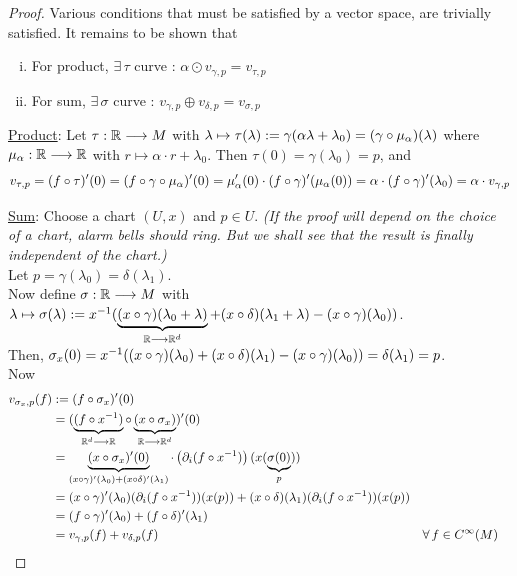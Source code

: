 \begin{proof} Various conditions that must be satisfied by a vector space, are trivially satisfied. It remains to be shown that 
\begin{enumerate}[i)]
  \item For product, $\exists \, \tau $ curve : $\alpha \odot v_{\gamma,p} = v_{\tau,p}$
  \item For sum, $\exists \, \sigma$ curve : $v_{\gamma,p} \oplus v_{\delta,p} = v_{\sigma,p}$
\end{enumerate}
\underline{Product}: Let $\tau : \mathbb{R} \longrightarrow M$ with $\lambda \mapsto \tau(\lambda) := \gamma(\alpha  \lambda + \lambda_0) = (\gamma \circ \mu_{\alpha})(\lambda)$
where $\mu_{\alpha} : \mathbb{R} \longrightarrow \mathbb{R}$ with $r \mapsto \alpha \cdot r + \lambda_0$. Then $\tau(0) = \gamma(\lambda_0) = p$, and
\[
v_{\tau,p} = (f \circ \tau)^{\prime}(0) = (f \circ \gamma \circ \mu_{\alpha})^{\prime}(0) = \mu_{\alpha}^{\prime}(0) \cdot (f \circ \gamma)^{\prime}(\mu_{\alpha}(0)) = \alpha \cdot (f \circ \gamma)^{\prime}(\lambda_0) = \alpha \cdot v_{\gamma,p}
\]

\underline{Sum}: Choose a chart $(U,x)$ and $p \in U$. \textit{(If the proof will depend on the choice of a chart, alarm bells should ring. But we shall see that the result is finally independent of the chart.)} \\
Let $p = \gamma(\lambda_0) = \delta(\lambda_1)$. \\
Now define $\sigma : \mathbb{R} \longrightarrow M$ with $\lambda \mapsto \sigma(\lambda) := x^{-1}(\underbrace{(x \circ \gamma)(\lambda_0 + \lambda)}_{\mathbb{R} \longrightarrow \mathbb{R}^d} + (x \circ \delta)(\lambda_1 + \lambda) - (x \circ \gamma)(\lambda_0))$. \\
Then, $\sigma_x(0) = x^{-1}((x \circ \gamma)(\lambda_0) + (x \circ \delta)(\lambda_1) - (x \circ \gamma)(\lambda_0)) = \delta(\lambda_1) = p$. \\
Now
\begin{align*}
  v_{\sigma_x,p}(f) & := (f \circ \sigma_x)^{\prime}(0) \\ 
  & = ( \underbrace{(f \circ x^{-1})}_{\mathbb{R}^d \longrightarrow \mathbb{R}} \circ \underbrace{(x \circ \sigma_x)}_{\mathbb{R} \longrightarrow \mathbb{R}^d})^{\prime}(0) \\
  & = \underbrace{(x \circ \sigma_x)^{\prime}(0)}_{(x \circ \gamma)^{\prime}(\lambda_0) + (x \circ \delta)^{\prime}(\lambda_1)} \cdot \left( \partial_i (f \circ x^{-1}) \right)(x(\underbrace{\sigma(0)}_{p})) \\
  & = (x \circ \gamma)^{\prime}(\lambda_0)(\partial_i (f \circ x^{-1}))(x(p)) + (x \circ \delta)(\lambda_1)(\partial_i (f \circ x^{-1}))(x(p)) \\
  & = (f \circ \gamma)^{\prime}(\lambda_0) + (f \circ \delta)^{\prime}(\lambda_1) \\
  & = v_{\gamma,p}(f) + v_{\delta,p}(f) && \forall \, f \in C^{\infty}(M)
\end{align*}
\end{proof}

